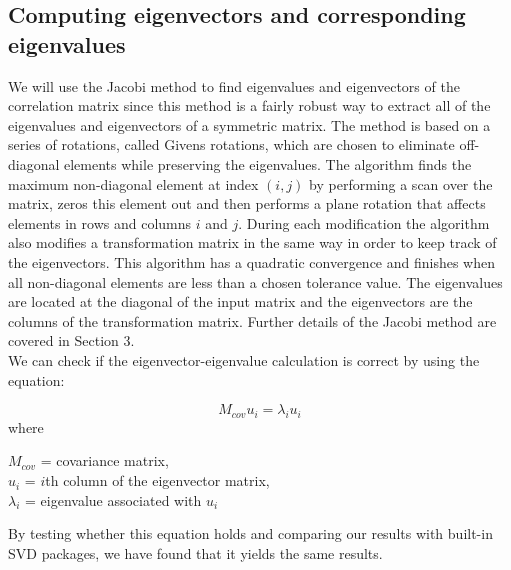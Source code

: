 \documentclass[12pt,twoside]{article}
\begin{document}
\subsection{Computing eigenvectors and corresponding eigenvalues}
\bigbreak
We will use the Jacobi method to find eigenvalues and eigenvectors of the correlation matrix since this method is a fairly robust way to extract all of the eigenvalues and eigenvectors of a symmetric matrix. The method is based on a series of rotations, called Givens rotations, which are chosen to eliminate off-diagonal elements while preserving the eigenvalues. The algorithm finds the maximum non-diagonal element at index $(i,j)$ by performing a scan over the matrix, zeros this element out and then performs a plane rotation that affects elements in rows and columns $i$ and $j$. During each modification the algorithm also modifies a transformation matrix in the same way in order to keep track of the eigenvectors. This algorithm has a quadratic convergence and finishes when all non-diagonal elements are less than a chosen tolerance value. The eigenvalues are located at the diagonal of the input matrix and the eigenvectors are the columns of the transformation matrix. Further details of the Jacobi method are covered in Section 3.\\

We can check if the eigenvector-eigenvalue calculation is correct by using the equation:

$$M_{cov} u_i = \lambda_i u_i$$ 
where
\begin{center}
$M_{cov}$ = covariance matrix, \\
$u_i$ = $i$th column of the eigenvector matrix, \\
$\lambda_i$ = eigenvalue associated with $u_i$\\
\end{center}
By testing whether this equation holds and comparing our results with built-in SVD packages, we have found that it yields the same results.
\end{document}
